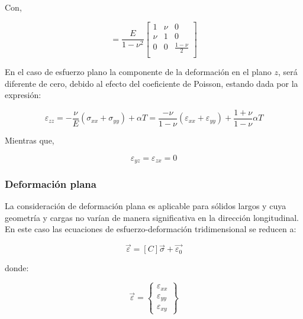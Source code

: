 Con, 

\begin{equation}
[D] = \frac{E}{1-\nu^2}
\left[\begin{matrix}
1 & \nu & 0 \\
\nu & 1 & 0 \\
0 & 0 & \frac{1-\nu}{2} \\
\end{matrix}\right]
\end{equation}

En el caso de esfuerzo plano la componente de la deformación en el plano $z$, será diferente de cero, debido al 
efecto del coeficiente de Poisson, estando dada  por la expresión:

\begin{equation}
\varepsilon_{zz} = -\frac{\nu}{E} (\sigma_{xx} + \sigma_{yy}) + \alpha T = 
\frac{-\nu}{1-\nu} (\varepsilon_{xx} + \varepsilon_{yy}) +  
\frac{1+\nu}{1-\nu} \alpha T
\end{equation}

Mientras que, 

\begin{equation}
\varepsilon_{yz} = \varepsilon_{zx} = 0
\end{equation}


\subsubsection{Deformación plana}

La consideración de deformación plana es aplicable para sólidos largos y cuya geometría y cargas no varían de 
manera significativa en la dirección longitudinal.\\

En este caso las ecuaciones de esfuerzo-deformación tridimensional se reducen a:

\begin{equation}
\vec{\varepsilon} = [C] \vec{\sigma} + \vec{\varepsilon_0}
\end{equation}

donde:

\begin{equation}
\vec{\varepsilon} = 
\left\{\begin{matrix}
\varepsilon_{xx} \\ \varepsilon_{yy} \\ \varepsilon_{xy}
\end{matrix}\right\}
\end{equation}

